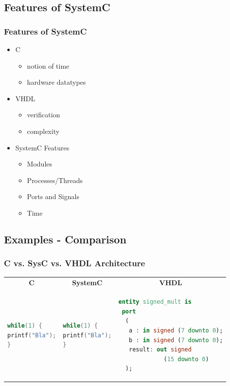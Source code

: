 \documentclass{beamer}
\begin{document}
\subsection{Features of SystemC}
\begin{frame} \frametitle{Features of SystemC} 
  \begin{itemize}
   \item C
    \begin{itemize}
      \item{notion of time}
      \item{hardware datatypes}
    \end{itemize}
   \item VHDL
    \begin{itemize}
      \item{verification}
      \item{complexity}
    \end{itemize}
   \item SystemC Features
    \begin{itemize}
      \item{Modules}
      \item{Processes/Threads}    
      \item{Ports and Signals}
      \item{Time}
    \end{itemize}
  \end{itemize}
\end{frame}

\subsection{Examples - Comparison}
\begin{frame}[fragile] \frametitle{C vs. SysC vs. VHDL Architecture} 
\begin{tabular}{p{}|p{}|p{}}
\multicolumn{1}{c}{\textbf{C}} & \multicolumn{1}{c}{\textbf{SystemC}} & \multicolumn{1}{c}{\textbf{VHDL}} \\
\begin{lstlisting}[language=C]
while(1) {
printf("Bla");
}
\end{lstlisting}
& 
\begin{lstlisting}[language=C++, ]
while(1) {
printf("Bla");
}
\end{lstlisting}
 &  
\begin{lstlisting}[language=VHDL]
entity signed_mult is
 port
  (
   a : in signed (7 downto 0);
   b : in signed (7 downto 0);
   result: out signed 
   		     (15 downto 0)
  );
\end{lstlisting}
\end{tabular}
\end{frame}
\end{document}
